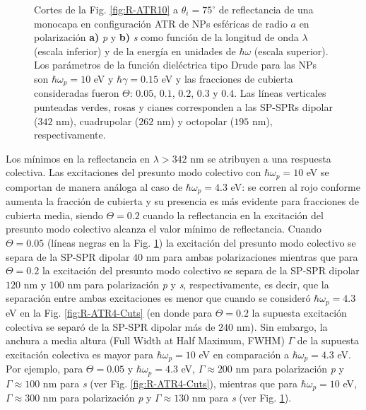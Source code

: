 \begin{figure}[h!]
	\caption{Cortes de la Fig. \ref{fig:R-ATR10} a $\theta_i = 75^\circ$ de reflectancia de una monocapa en configuración ATR de NPs esféricas de radio $a$ en polarización \textbf{a)} \emph{p} y \textbf{b)} \emph{s} como función de la longitud de onda $\lambda$ (escala inferior) y de la energía en unidades de $\hbar\omega$ (escala superior). Los parámetros de la función dieléctrica tipo Drude para las NPs son $\hbar\omega_p = 10$ eV y $\hbar\gamma = 0.15$ eV y las fracciones de cubierta consideradas fueron $\Theta$: $0. 05$, $0. 1$, $0. 2$, $0. 3$ y $0. 4$. Las líneas verticales punteadas verdes, rosas y cianes corresponden a las SP-SPRs dipolar ($342$ nm), cuadrupolar ($262$ nm) y octopolar ($195$ nm), respectivamente.  }\label{fig:R-ATR10-Cuts}
	\end{figure}	

Los mínimos en la reflectancia en $\lambda > 342$ nm se atribuyen a una respuesta colectiva. Las excitaciones del presunto modo colectivo con $\hbar\omega_p = 10$ eV se comportan de manera análoga al caso de $\hbar\omega_p = 4.3$ eV: se corren al rojo conforme aumenta la fracción de cubierta y su presencia es más evidente para fracciones de cubierta media, siendo  $\Theta=0.2$ cuando la reflectancia en la excitación del presunto modo colectivo alcanza el valor mínimo de reflectancia. Cuando $\Theta = 0.05$ (líneas negras en la Fig. \ref{fig:R-ATR10-Cuts}) la excitación del presunto modo colectivo se separa de la SP-SPR dipolar   $40$ nm para ambas polarizaciones mientras que para $\Theta = 0.2$ la excitación del presunto modo colectivo se separa de la SP-SPR dipolar  $120$ nm y $100$ nm para polarización \emph{p} y \emph{s}, respectivamente, es decir, que la separación entre ambas excitaciones es menor que cuando se consideró $\hbar\omega_p = 4.3$ eV en la Fig. \ref{fig:R-ATR4-Cuts} (en donde para $\Theta=0.2$ la supuesta excitación colectiva se separó de la SP-SPR dipolar más de $240$ nm). Sin embargo, la anchura a media altura (Full Width at Half Maximum, FWHM) $\Gamma$ de la supuesta excitación colectiva es mayor para $\hbar\omega_p=10$ eV en comparación a $\hbar\omega_p=4.3$ eV. Por ejemplo, para $\Theta = 0.05$ y $\hbar\omega_p = 4.3$ eV,  $\Gamma\approx 200$ nm para polarización \emph{p} y  $\Gamma\approx 100$ nm para  \emph{s} (ver Fig. \ref{fig:R-ATR4-Cuts}), mientras que para  $\hbar\omega_p = 10$ eV,  $\Gamma\approx 300$ nm para polarización \emph{p} y  $\Gamma\approx 130$ nm para  \emph{s} (ver Fig. \ref{fig:R-ATR10-Cuts}).

